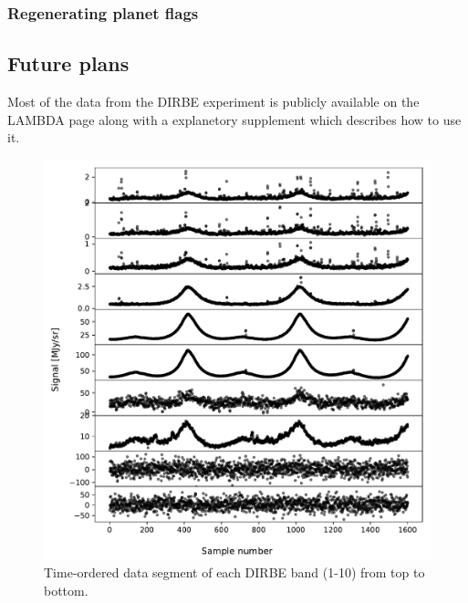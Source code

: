 \documentclass{aa}
\begin{document}
\subsubsection{Regenerating planet flags}

\subsection{Future plans}
Most of the data from the DIRBE experiment is publicly available on the LAMBDA page along with a explanetory supplement which describes how to use it.



\begin{figure}
  \centering
   	\includegraphics[width=\linewidth]{figs/cios.pdf}
  	\caption{Time-ordered data segment of each DIRBE band (1-10) from top to bottom.}
	\label{fig: cios}
\end{figure}
\end{document}
